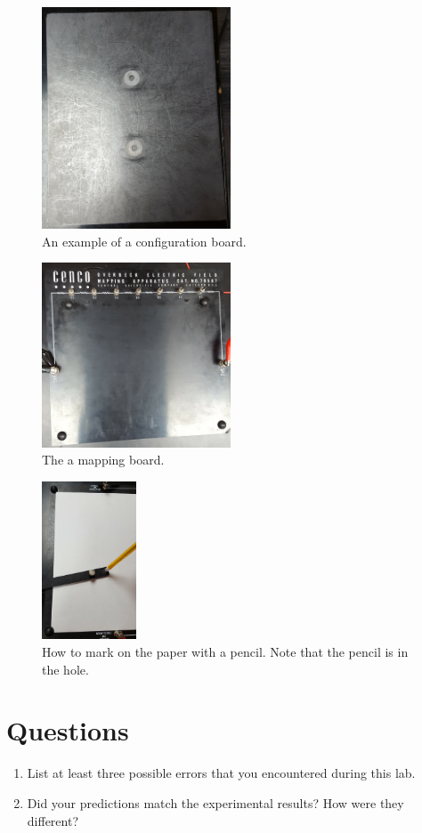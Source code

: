 \documentclass[12pt]{article}
\begin{document}
\begin{figure}[!h]
	\begin{center}
		\includegraphics[width=0.5\textwidth]{config_board}
		\caption{An example of a configuration board.}
		\label{fig:config_board}
	\end{center}
\end{figure}

\begin{figure}[H]
	\begin{center}
		\includegraphics[width=0.5\textwidth]{mapping_board}
		\caption{The a mapping board.}
		\label{fig:mapping_board}
	\end{center}
\end{figure}

\begin{figure}[H]
	\begin{center}
		\includegraphics[width=0.25\textwidth]{pencil}
		\caption{How to mark on the paper with a pencil. Note that the pencil is in the hole.}
		\label{fig:pencil}
	\end{center}
\end{figure}

\section*{Questions}
\begin{enumerate}
	\item{List at least three possible errors that you encountered during this lab.}
	\item{Did your predictions match the experimental results? How were they different?}
\end{enumerate}
\end{document}

